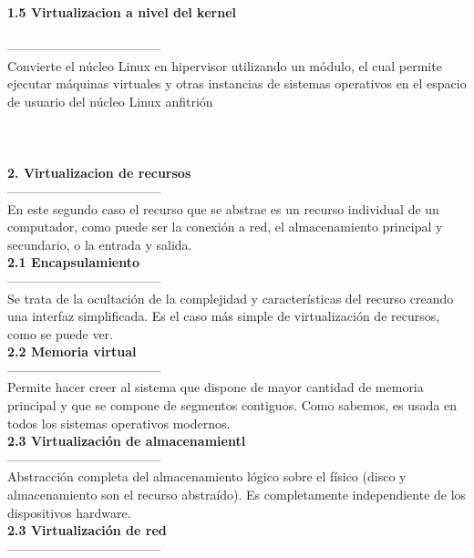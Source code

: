 \documentclass[twoside,twocolumn]{article}
\begin{document}
\begin{flushright}
\begin{itemize}
\textbf{1.5 Virtualizacion a nivel del kernel }\\
\textbf{}\\

------------------------------------
\textbf{}\\
Convierte el núcleo Linux en hipervisor
utilizando un módulo, el cual permite ejecutar máquinas virtuales y otras
instancias de sistemas operativos en el espacio de usuario del núcleo Linux
anfitrión
\textbf{}\\
\textbf{}\\
\textbf{}\\
\textbf{}\\
 \textbf{2. Virtualizacion de recursos }\\
------------------------------------
\textbf{}\\
En este segundo caso el recurso que se abstrae es un recurso
individual de un computador, como puede ser la conexión a red, el almacenamiento
principal y secundario, o la entrada y salida.
\textbf{}\\
 \textbf{2.1  Encapsulamiento }\\
------------------------------------
\textbf{}\\
Se trata de la ocultación de la complejidad y características del
recurso creando una interfaz simplificada. Es el caso más simple de
virtualización de recursos, como se puede ver.
\textbf{}\\
 \textbf{2.2  Memoria virtual }\\
------------------------------------
\textbf{}\\
Permite hacer creer al sistema que dispone de mayor cantidad
de memoria principal y que se compone de segmentos contiguos. Como
sabemos, es usada en todos los sistemas operativos modernos. 
\textbf{}\\
\textbf{2.3  Virtualización de almacenamientl }\\
------------------------------------
\textbf{}\\
Abstracción completa del almacenamiento
lógico sobre el físico (disco y almacenamiento son el recurso abstraído). Es
completamente independiente de los dispositivos hardware.
\textbf{}\\
\textbf{2.3 Virtualización de red }\\
------------------------------------


\end{itemize}
\end{flushright}
\end{document}
